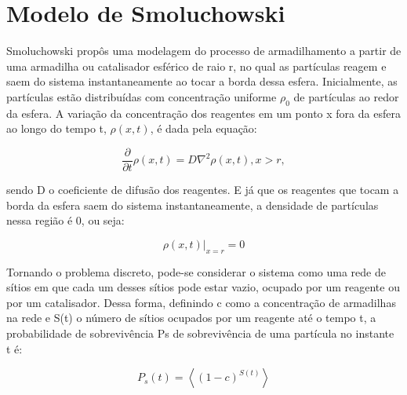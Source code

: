 
\section{Modelo de Smoluchowski}

Smoluchowski propôs uma modelagem do processo de armadilhamento a partir de uma
armadilha ou catalisador esférico de raio r, no qual as partículas reagem e saem
do sistema instantaneamente ao tocar a borda dessa esfera. Inicialmente, as
partículas estão distribuídas com concentração uniforme $\rho_0$ de partículas
ao redor da esfera\cite{3}. A variação da concentração dos reagentes em um
ponto x fora da esfera ao longo do tempo t, $\rho(x,t)$, é dada pela
equação\cite{3}:

{
\setlength{\belowdisplayskip}{0pt} \setlength{\belowdisplayshortskip}{0pt}
\setlength{\abovedisplayskip}{0pt} \setlength{\abovedisplayshortskip}{0pt}

\begin{equation}
  \frac{\partial}{\partial t}\rho(x,t) = D\nabla^2\rho(x,t), x>r,
  \label{Equation-021}
\end{equation}
}

\noindent sendo D o coeficiente de difusão dos reagentes. E já que os reagentes
que tocam a borda da esfera saem do sistema instantaneamente, a densidade de
partículas nessa região é 0, ou seja\cite{3}:

{
\setlength{\belowdisplayskip}{0pt} \setlength{\belowdisplayshortskip}{0pt}
\setlength{\abovedisplayskip}{0pt} \setlength{\abovedisplayshortskip}{0pt}

\begin{equation}
  \rho(x,t)|_{x=r} = 0
  \label{Equation-022}
\end{equation}
}

Tornando o problema discreto, pode-se considerar o sistema como uma rede de
sítios em que cada um desses sítios pode estar vazio, ocupado por um reagente
ou por um catalisador\cite{3}.  Dessa forma, definindo c como a concentração de
armadilhas na rede e S(t) o número de sítios ocupados por um reagente até o
tempo t, a probabilidade de sobrevivência Ps de sobrevivência de uma partícula
no instante t é\cite{6}:

{
\setlength{\belowdisplayskip}{0pt} \setlength{\belowdisplayshortskip}{0pt}
\setlength{\abovedisplayskip}{0pt} \setlength{\abovedisplayshortskip}{0pt}

\begin{equation}
  P_s(t) = \left<(1-c)^{S(t)}\right>
  \label{Equation-023-Probabilidade}
\end{equation}
}

